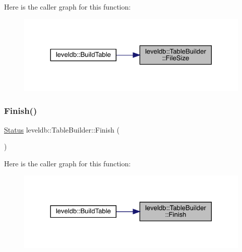 Here is the caller graph for this function\+:
\nopagebreak
\begin{figure}[H]
\begin{center}
\leavevmode
\includegraphics[width=324pt]{classleveldb_1_1_table_builder_a50ac83aca1c3321f16f26748d654a6ae_icgraph}
\end{center}
\end{figure}
\mbox{\label{classleveldb_1_1_table_builder_a88f4bae006782e24462362d489dd3f35}} 
\subsubsection{\texorpdfstring{Finish()}{Finish()}}
{\footnotesize\ttfamily \mbox{\hyperlink{classleveldb_1_1_status}{Status}} leveldb\+::\+Table\+Builder\+::\+Finish (\begin{DoxyParamCaption}{ }\end{DoxyParamCaption})}

Here is the caller graph for this function\+:
\nopagebreak
\begin{figure}[H]
\begin{center}
\leavevmode
\includegraphics[width=324pt]{classleveldb_1_1_table_builder_a88f4bae006782e24462362d489dd3f35_icgraph}
\end{center}
\end{figure}
\mbox{\label{classleveldb_1_1_table_builder_a544560b4c97cd382ba9b8e0ef69dacfa}} 
